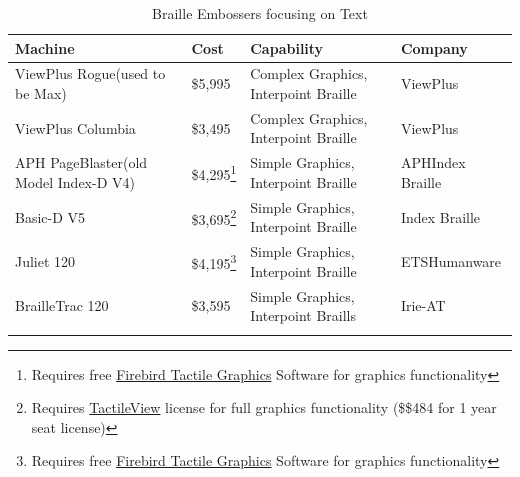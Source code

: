 \documentclass[14pt, letterpaper,twoside]{extreport}
\begin{document}
\begin{longtable}[]{@{}
    >{\raggedright\arraybackslash}p{}
    >{\raggedright\arraybackslash}p{}
    >{\raggedright\arraybackslash}p{}
    >{\raggedright\arraybackslash}p{}@{}
    }
    \toprule\noalign{}
    
    \textbf{Machine}                             & \textbf{Cost}                                                                                                                                                         & \textbf{Capability}                  & \textbf{Company}        \\
    \midrule\noalign{}
    \endhead
    \bottomrule\noalign{}
    \endlastfoot
    ViewPlus Rogue\break (used to be Max)        & \$5,995                                                                                                                                                               & Complex Graphics, Interpoint Braille & ViewPlus                \\[1.0em]
    ViewPlus Columbia                            & \$3,495                                                                                                                                                               & Complex Graphics, Interpoint Braille & ViewPlus                \\[1.0em]
    APH PageBlaster\break (old Model Index-D V4) & \$4,295\footnote{Requires free \href{https://www.aph.org/app/uploads/2020/07/Firebird_signed_V31.zip}{Firebird Tactile Graphics} Software for graphics functionality} & Simple Graphics, Interpoint Braille  & APH\break Index Braille \\[1.0em]
    Basic-D V5                                   & \$3,695\footnote{Requires \href{https://tactileview.com/}{TactileView} license for full graphics functionality (\$\$484 for 1 year seat license)}                     & Simple Graphics, Interpoint Braille  & Index Braille           \\[1.0em]
    Juliet 120                                   & \$4,195\footnote{Requires free \href{https://www.aph.org/app/uploads/2020/07/Firebird_signed_V31.zip}{Firebird Tactile Graphics} Software for graphics functionality} & Simple Graphics, Interpoint Braille  & ETS\break Humanware     \\[1.0em]
    BrailleTrac 120                              & \$3,595                                                                                                                                                               & Simple Graphics, Interpoint Braills  & Irie-AT                 \\[1.0em]\hline
    \caption{ Braille Embossers focusing on Text}
\end{longtable}
\end{document}

